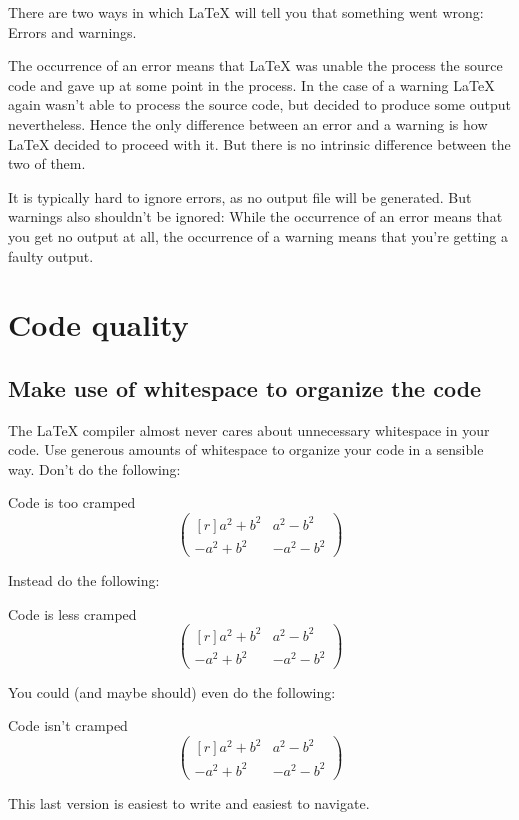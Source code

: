 There are two ways in which {\LaTeX} will tell you that something went wrong:
Errors and warnings.

The occurrence of an error means that {\LaTeX} was unable the process the source code and gave up at some point in the process.
In the case of a warning {\LaTeX} again wasn’t able to process the source code, but decided to produce some output nevertheless.
Hence the only difference between an error and a warning is how {\LaTeX} decided to proceed with it.
But there is no intrinsic difference between the two of them.

It is typically hard to ignore errors, as no output file will be generated.
But warnings also shouldn’t be ignored:
While the occurrence of an error means that you get no output at all, the occurrence of a warning means that you’re getting a faulty output.






\section{Code quality}



\subsection{Make use of whitespace to organize the code}

The {\LaTeX} compiler almost never cares about unnecessary whitespace in your code.
Use generous amounts of whitespace to organize your code in a sensible way.
Don’t do the following:
\begin{showcode}{Code is too cramped}
\[\begin{pmatrix*}[r]a^2+b^2&a^2-b^2\\-a^2+b^2&-a^2-b^2\end{pmatrix*}\]
\end{showcode}
Instead do the following:
\begin{showcode}{Code is less cramped}
\[
  \begin{pmatrix*}[r]
     a^2 + b^2 &  a^2 - b^2 \\
    -a^2 + b^2 & -a^2 - b^2
  \end{pmatrix*}
\]
\end{showcode}
You could (and maybe should) even do the following:
\begin{showcode}{Code isn’t cramped}
\[
  \begin{pmatrix*}[r]
    a^2 + b^2
    &
    a^2 - b^2
    \\
    - a^2 + b^2
    &
    - a^2 - b^2
  \end{pmatrix*}
\]
\end{showcode}
This last version is easiest to write and easiest to navigate.

